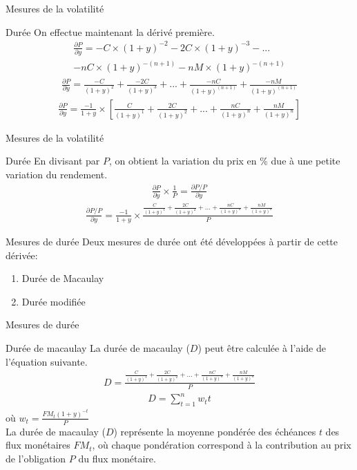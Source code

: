 \documentclass[11pt]{beamer}
\begin{document}
\begin{frame}{Mesures de la volatilité}
\begin{block}{Durée}
On effectue maintenant la dérivé première.
\begin{align*}
\frac{\partial P}{\partial y}=-C \times (1+y)^{-2}-2C \times (1+y)^{-3}-...\\-nC \times (1+y)^{-(n+1)}-nM \times (1+y)^{-(n+1)}
\end{align*}
\begin{align*}
\frac{\partial P}{\partial y}=\frac{-C}{(1+y)^2}+\frac{-2C}{(1+y)^3}+...+\frac{-nC}{(1+y)^{(n+1)}}+\frac{-nM}{(1+y)^{(n+1)}}
\end{align*}
\begin{align*}
\frac{\partial P}{\partial y}= \frac{-1}{1+y} \times \left[ \frac{C}{(1+y)^1}+\frac{2C}{(1+y)^2}+...+\frac{nC}{(1+y)^{n}}+\frac{nM}{(1+y)^{n}} \right]
\end{align*}
\end{block}
\end{frame}

\begin{frame}{Mesures de la volatilité}
\begin{block}{Durée}
En divisant par $P$, on obtient la variation du prix en \% due à une petite variation du rendement.
\begin{align*}
\frac{\partial P}{\partial y} \times \frac{1}{P}=\frac{\partial P/P}{\partial y} 
\end{align*}
\begin{align*}
\frac{\partial P/P}{\partial y} = \frac{-1}{1+y} \times \frac{\frac{C}{(1+y)^1}+\frac{2C}{(1+y)^2}+...+\frac{nC}{(1+y)^{n}}+\frac{nM}{(1+y)^{n}}}{P}
\end{align*}
\end{block}
\end{frame}

\begin{frame}{Mesures de durée}
Deux mesures de durée ont été développées à partir de cette dérivée: 
\begin{enumerate}
\item Durée de Macaulay
\item Durée modifiée
\end{enumerate}
\end{frame}

\begin{frame}{Mesures de durée}
\begin{block}{Durée de macaulay}
La durée de macaulay ($D$) peut être calculée à l'aide de l'équation suivante.
\begin{align*}
D=\frac{\frac{C}{(1+y)^1}+\frac{2C}{(1+y)^2}+...+\frac{nC}{(1+y)^{n}}+\frac{nM}{(1+y)^{n}}}{P}
\end{align*}
\begin{align*}
D=\sum_{t=1}^nw_t t
\end{align*}
où $w_t=\frac{FM_t (1+y)^{-t}}{P}$\\
La durée de macaulay ($D$) représente la moyenne pondérée des échéances $t$ des flux monétaires $FM_t$, où chaque pondération correspond à la contribution au prix de l’obligation $P$ du flux monétaire.
\end{block}
\end{frame}
\end{document}
